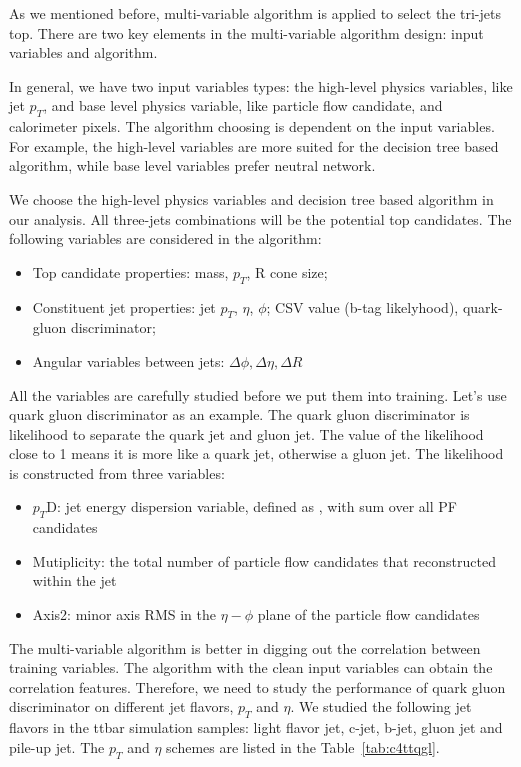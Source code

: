 As we mentioned before, multi-variable algorithm is applied to select the tri-jets top. There are two key elements in the multi-variable algorithm design: input variables and algorithm. 

In general, we have two input variables types: the high-level physics variables, like jet $p_{T}$, and base level physics variable, like particle flow candidate, and calorimeter pixels. The algorithm choosing is dependent on the input variables. For example, the high-level variables are more suited for the decision tree based algorithm, while base level variables prefer neutral network. 

We choose the high-level physics variables and decision tree based algorithm in our analysis. All three-jets combinations will be the potential top candidates. The following variables are considered in the algorithm: 
\begin{itemize}
\item Top candidate properties: mass, $p_{T}$, R cone size;
\item Constituent jet properties: jet $p_{T}$, $\eta$, $\phi$; CSV value (b-tag likelyhood), quark-gluon discriminator;
\item Angular variables between jets: $\Delta \phi, \Delta \eta, \Delta R$
\end{itemize}

All the variables are carefully studied before we put them into training. Let’s use quark gluon discriminator as an example. The quark gluon discriminator is likelihood to separate the quark jet and gluon jet. The value of the likelihood close to 1 means it is more like a quark jet, otherwise a gluon jet. The likelihood is constructed from three variables: 
\begin{itemize}
\item $p_{T}$D: jet energy dispersion variable, defined as $ $, with sum over all PF candidates
\item Mutiplicity: the total number of particle flow candidates that reconstructed within the jet
\item Axis2: minor axis RMS in the $\eta - \phi$ plane of the particle flow candidates
\end{itemize}

The multi-variable algorithm is better in digging out the correlation between training variables. The algorithm with the clean input variables can obtain the correlation features. Therefore, we need to study the performance of quark gluon discriminator on different jet flavors, $p_{T}$ and $\eta$. We studied the following jet flavors in the ttbar simulation samples: light flavor jet, c-jet, b-jet, gluon jet and pile-up jet. The $p_{T}$ and $\eta$ schemes are listed in the Table~\ref{tab:c4ttqgl}.


